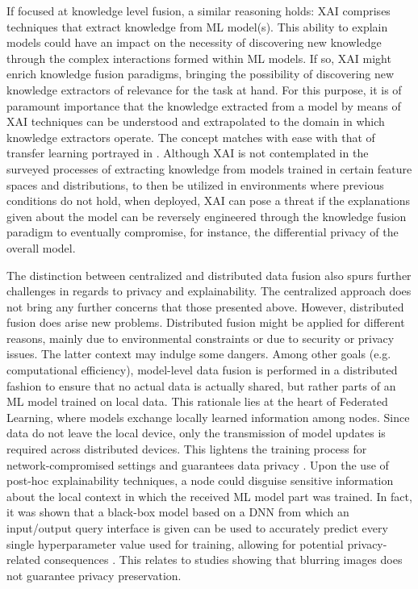 \documentclass[final]{elsarticle}
\begin{document}
If focused at knowledge level fusion, a similar reasoning holds: XAI comprises techniques that extract knowledge from ML model(s). This ability to explain models could have an impact on the necessity of discovering new knowledge through the complex interactions formed within ML models. If so, XAI might enrich knowledge fusion paradigms, bringing the possibility of discovering new knowledge extractors of relevance for the task at hand. For this purpose, it is of paramount importance that the knowledge extracted from a model by means of XAI techniques can be understood and extrapolated to the domain in which knowledge extractors operate. The concept matches with ease with that of transfer learning portrayed in \cite{pan2009survey}. Although XAI is not contemplated in the surveyed processes of extracting knowledge from models trained in certain feature spaces and distributions, to then be utilized in environments where previous conditions do not hold, when deployed, XAI can pose a threat if the explanations given about the model can be reversely engineered through the knowledge fusion paradigm to eventually compromise, for instance, the differential privacy of the overall model.

The distinction between centralized and distributed data fusion also spurs further challenges in regards to privacy and explainability. The centralized approach does not bring any further concerns that those presented above. However, distributed fusion does arise new problems. Distributed fusion might be applied for different reasons, mainly due to environmental constraints or due to security or privacy issues. The latter context may indulge some dangers. Among other goals (e.g. computational efficiency), model-level data fusion is performed in a distributed fashion to ensure that no actual data is actually shared, but rather parts of an ML model trained on local data. This rationale lies at the heart of Federated Learning, where models exchange locally learned information among nodes. Since data do not leave the local device, only the transmission of model updates is required across distributed devices. This lightens the training process for network-compromised settings and guarantees data privacy \cite{konevcny2016federated}. Upon the use of post-hoc explainability techniques, a node could disguise sensitive information about the local context in which the received ML model part was trained. In fact, it was shown that a black-box model based on a DNN from which an input/output query interface is given can be used to accurately predict every single hyperparameter value used for training, allowing for potential privacy-related consequences \cite{Oh19, Oh16, Aditya16}. This relates to studies showing that blurring images does not guarantee privacy preservation.
\end{document}
